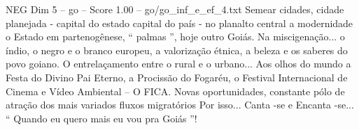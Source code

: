 \begin{textsample}{NEG Dim 5 – go – Score 1.00 – go/go\_inf\_e\_ef\_4.txt}
Semear cidades, cidade planejada - capital do estado capital do país - no planalto central a modernidade o Estado em partenogênese, “ palmas ”, hoje outro Goiás.
Na miscigenação... o índio, o negro e o branco europeu, a valorização étnica, a beleza e os saberes do povo goiano.
O entrelaçamento entre o rural e o urbano...
Aos olhos do mundo a Festa do Divino Pai Eterno, a Procissão do Fogaréu, o Festival Internacional de Cinema e Vídeo Ambiental – O FICA.
Novas oportunidades, constante pólo de atração dos mais variados fluxos migratórios Por isso...
Canta -se e Encanta -se... “ Quando eu quero mais eu vou pra Goiás ”!

\end{textsample}
